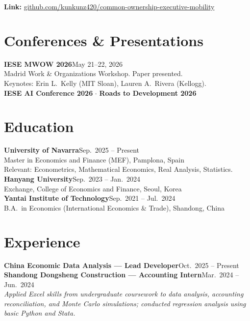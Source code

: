 \documentclass[9.5pt, letterpaper]{article}
\newcommand{\entry}[2]{\textbf{#1}\hfill{\small #2}}
\begin{document}
\textbf{Link:} \href{https://github.com/kunkunz420/common-ownership-executive-mobility}{github.com/kunkunz420/common-ownership-executive-mobility}

\section*{Conferences \& Presentations}

\entry{IESE MWOW 2026}{May 21--22, 2026}\\[2pt]
{\small Madrid Work \& Organizations Workshop. Paper presented.}\\[1pt]
{\small Keynotes: Erin L.\ Kelly (MIT Sloan), Lauren A.\ Rivera (Kellogg).}\\[3pt]

\noindent\textbf{IESE AI Conference 2026} \;$\cdot$\; \textbf{Roads to Development 2026}

\section*{Education}

\entry{University of Navarra}{Sep.\ 2025 -- Present}\\[2pt]
{\small Master in Economics and Finance (MEF), Pamplona, Spain}\\[1pt]
{\small Relevant: Econometrics, Mathematical Economics, Real Analysis, Statistics.}\\[5pt]

\entry{Hanyang University}{Sep.\ 2023 -- Jan.\ 2024}\\[2pt]
{\small Exchange, College of Economics and Finance, Seoul, Korea}\\[5pt]

\entry{Yantai Institute of Technology}{Sep.\ 2021 -- Jul.\ 2024}\\[2pt]
{\small B.A.\ in Economics (International Economics \& Trade), Shandong, China}

\section*{Experience}

\entry{China Economic Data Analysis --- Lead Developer}{Oct.\ 2025 -- Present}\\[3pt]

\entry{Shandong Dongsheng Construction --- Accounting Intern}{Mar.\ 2024 -- Jun.\ 2024}\\[2pt]
{\small\itshape Applied Excel skills from undergraduate coursework to data analysis,
accounting reconciliation, and Monte Carlo simulations; conducted regression analysis
using basic Python and Stata.}
\end{document}

